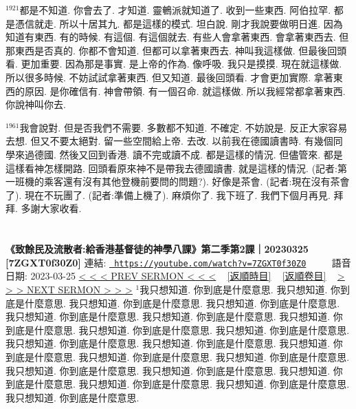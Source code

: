 \documentclass{book}
\begin{document}
$^{1921}$都是不知道.
你會去了.
才知道.
靈鵪派就知道了.
收到一些東西.
阿伯拉罕.
都是憑信就走.
所以十居其九.
都是這樣的模式.
坦白說.
剛才我說要做明日進.
因為知道有東西.
有的時候.
有這個.
有這個就去.
有些人會拿著東西.
會拿著東西去.
但那東西是否真的.
你都不會知道.
但都可以拿著東西去.
神叫我這樣做.
但最後回頭看.
更加重要.
因為那是事實.
是上帝的作為.
像呼吸.
我只是摸摸.
現在就這樣做.
所以很多時候.
不妨試試拿著東西.
但又知道.
最後回頭看.
才會更加實際.
拿著東西的原因.
是你確信有.
神會帶領.
有一個召命.
就這樣做.
所以我經常都拿著東西.
你說神叫你去.

$^{1961}$我會說對.
但是否我們不需要.
多數都不知道.
不確定.
不妨說是.
反正大家容易去想.
但又不要太絕對.
留一些空間給上帝.
去改.
以前我在德國讀書時.
有幾個同學來過德國.
然後又回到香港.
讀不完或讀不成.
都是這樣的情況.
但儘管來.
都是這樣看神怎樣開路.
回頭看原來神不是帶我去德國讀書.
就是這樣的情況.
(記者:第一班機的乘客還有沒有其他登機前要問的問題?).
好像是茶會.
(記者:現在沒有茶會了).
現在不玩團了.
(記者:準備上機了).
麻煩你了.
我下班了.
我們下個月再見.
拜拜.
多謝大家收看.
\newpage



\section{}
\label{sec:7ZGXT0f30Z0}
\textbf{《致餘民及流散者:給香港基督徒的神學八課》第二季第2課｜20230325 [7ZGXT0f30Z0]}
\newline
\newline
連結: \href{https://youtube.com/watch?v=7ZGXT0f30Z0}{\texttt{ https://youtube.com/watch?v=7ZGXT0f30Z0}} ~~~~ 語音日期: 2023-03-25 
\newline
\newline
\hyperref[sec:y5NJfoAjRCI]{\small{< < < PREV SERMON < < <}}
~
\hyperref[sec:index_chronic]{\small{[返順時目]}}
~
\hyperref[sec:index_scriptual]{\small{[返順卷目]}}
~
\hyperref[sec:8KdYgVn_hzk]{\small{> > > NEXT SERMON > > >}}
\newline
\newline
$^{1}$我只想知道.
你到底是什麼意思.
我只想知道.
你到底是什麼意思.
我只想知道.
你到底是什麼意思.
我只想知道.
你到底是什麼意思.
我只想知道.
你到底是什麼意思.
我只想知道.
你到底是什麼意思.
我只想知道.
你到底是什麼意思.
我只想知道.
你到底是什麼意思.
我只想知道.
你到底是什麼意思.
我只想知道.
你到底是什麼意思.
我只想知道.
你到底是什麼意思.
我只想知道.
你到底是什麼意思.
我只想知道.
你到底是什麼意思.
我只想知道.
你到底是什麼意思.
我只想知道.
你到底是什麼意思.
我只想知道.
你到底是什麼意思.
我只想知道.
你到底是什麼意思.
我只想知道.
你到底是什麼意思.
我只想知道.
你到底是什麼意思.
我只想知道.
你到底是什麼意思.
\end{document}
